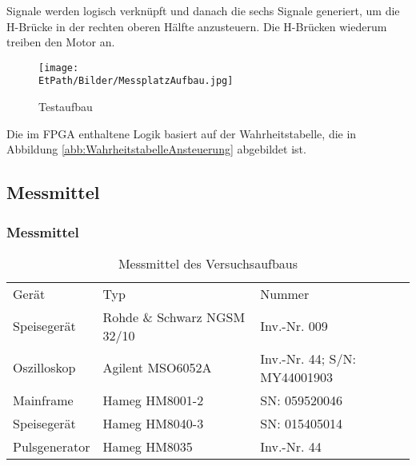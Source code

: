     Signale werden logisch verknüpft und danach die sechs Signale 
    generiert, um die H-Brücke in der rechten oberen Hälfte anzusteuern. 
    Die H-Brücken wiederum treiben den Motor an.
    \begin{figure}[h!]
       	\texttt{[image: \\EtPath/Bilder/MessplatzAufbau.jpg]}
       	\centering
       	\caption{Testaufbau} 
        \label{abb:MessplatzAufbau}
    \end{figure}
    Die im FPGA enthaltene Logik basiert auf der Wahrheitstabelle, die in 
    Abbildung \ref{abb:WahrheitstabelleAnsteuerung} abgebildet ist.

\ifSTANDALONE
\subsection{Messmittel}
\fi
\ifEMBED
\newpage
\subsubsection{Messmittel}
\fi
    \begin{table}[h!]
        \centering
        \begin{tabular}{lll}
            \rowcolor{gray}
            Gerät &
                Typ &
                Nummer \\
            Speisegerät & 
                Rohde \& Schwarz NGSM 32/10 &
                Inv.-Nr. 009 \\
            Oszilloskop &
                Agilent MSO6052A &
                Inv.-Nr. 44; S/N: MY44001903 \\
            Mainframe &
                Hameg HM8001-2 &
                SN: 059520046 \\
            Speisegerät &
                Hameg HM8040-3 &
                SN: 015405014 \\
            Pulsgenerator &
                Hameg HM8035 &
                Inv.-Nr. 44 \\
        \end{tabular}
        \caption{Messmittel des Versuchsaufbaus}
    \end{table}
